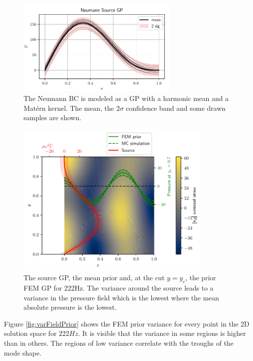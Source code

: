 \documentclass[%
  a4paper,oneside,%
  11pt,%
  smallchapters,
  style=printdev,
  extramargin,
  green,%
  rgb, <cmyk>
  ]{tubsbook}
\begin{document}
\begin{figure}[!ht]
\includegraphics[width=0.7\textwidth]{pics/NeumannBC.pdf}
\centering
\caption[Neumann source GP]{The Neumann BC is modeled as a GP with a harmonic mean and a Mat\'ern kernel. The mean, the $2 \sigma$ confidence band and some drawn samples are shown.}
\label{fig:NeumannBC}
\end{figure}
%
\begin{figure}[!ht]
\includegraphics[width=0.85\textwidth]{pics/SolutionCustom2D.pdf}
\centering
\caption[Overview of the source and prior GP]{The source GP, the mean prior and, at the cut $y=y_c$, the prior FEM GP for 222Hz. The variance around the source leads to a variance in the pressure field which is the lowest where the mean absolute pressure is the lowest.}
\label{fig:FEMGP}
\end{figure}
%
Figure \ref{fig:varFieldPrior} shows the FEM prior variance for every point in the 2D solution space for $222Hz$. It is visible that the variance in some regions is higher than in others. The regions of low variance correlate with the troughs of the mode shape.
%
\end{document}
